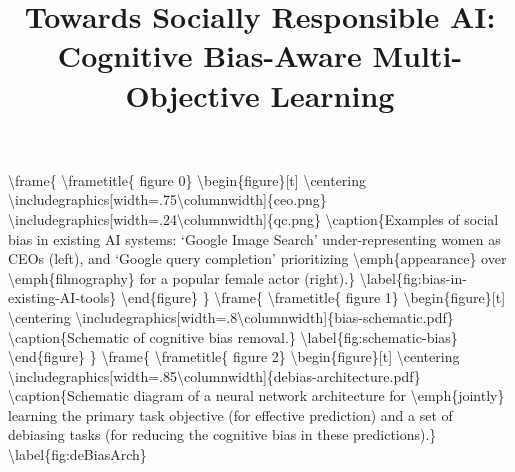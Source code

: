 \documentclass{beamer}%
\title{Towards Socially Responsible AI: Cognitive Bias{-}Aware Multi{-}Objective Learning\newline%
}%
\begin{document}
%
\normalsize%
\maketitle%
\textbackslash{}frame\{%
\textbackslash{}frametitle\{%
figure 0\}%
\textbackslash{}begin\{figure\}{[}t{]}\newline%
    \textbackslash{}centering\newline%
    \textbackslash{}includegraphics{[}width=.75\textbackslash{}columnwidth{]}\{ceo.png\}\newline%
    \textbackslash{}includegraphics{[}width=.24\textbackslash{}columnwidth{]}\{qc.png\}\newline%
    \textbackslash{}caption\{Examples of social bias in existing AI systems: `Google Image Search' under{-}representing women as CEOs (left), and `Google query completion' prioritizing \textbackslash{}emph\{appearance\} over \textbackslash{}emph\{filmography\} for a popular female actor (right).\}\newline%
    \textbackslash{}label\{fig:bias{-}in{-}existing{-}AI{-}tools\}\newline%
\textbackslash{}end\{figure\}%
\}%
\textbackslash{}frame\{%
\textbackslash{}frametitle\{%
figure 1\}%
\textbackslash{}begin\{figure\}{[}t{]}\newline%
    \textbackslash{}centering\newline%
    \textbackslash{}includegraphics{[}width=.8\textbackslash{}columnwidth{]}\{bias{-}schematic.pdf\}\newline%
    \textbackslash{}caption\{Schematic of cognitive bias removal.\}\newline%
    \textbackslash{}label\{fig:schematic{-}bias\}\newline%
\textbackslash{}end\{figure\}%
\}%
\textbackslash{}frame\{%
\textbackslash{}frametitle\{%
figure 2\}%
\textbackslash{}begin\{figure\}{[}t{]}\newline%
    \textbackslash{}centering\newline%
    \textbackslash{}includegraphics{[}width=.85\textbackslash{}columnwidth{]}\{debias{-}architecture.pdf\}\newline%
    \textbackslash{}caption\{Schematic diagram of a neural network architecture for \textbackslash{}emph\{jointly\} learning the primary task objective (for effective prediction) and a set of debiasing tasks (for reducing the cognitive bias in these predictions).\}\newline%
\textbackslash{}label\{fig:deBiasArch\}\newline%
\end{document}
